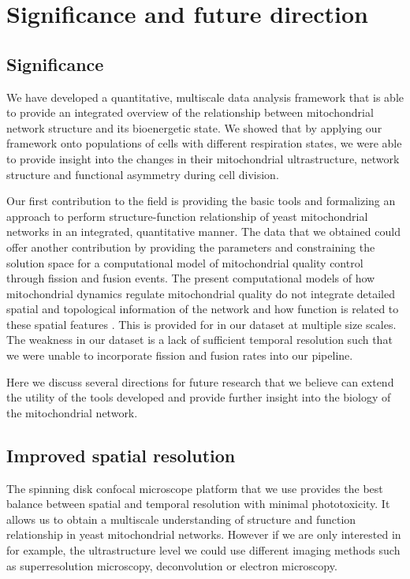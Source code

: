 \chapter{Significance and future direction}\label{ch:seven}
\section{Significance}
We have developed a quantitative, multiscale data analysis framework that is able to provide an integrated overview of the relationship between mitochondrial network structure and its bioenergetic state. We showed that by applying our framework onto populations of cells with different respiration states, we were able to provide insight into the changes in their mitochondrial ultrastructure, network structure and functional asymmetry during cell division.

Our first contribution to the field is providing the basic tools and formalizing an approach to perform structure-function relationship of yeast mitochondrial networks in an integrated, quantitative manner. The data that we obtained could offer another contribution by providing the parameters and constraining the solution space for a computational model of mitochondrial quality control through fission and fusion events. The present computational models of how mitochondrial dynamics regulate mitochondrial quality do not integrate detailed spatial and topological information of the network and how function is related to these spatial features \cite{mouli_frequency_2009,patel_optimal_2013}. This is provided for in our dataset at multiple size scales. The weakness in our dataset is a lack of sufficient temporal resolution such that we were unable to incorporate fission and fusion rates into our pipeline.
 
Here we discuss several directions for future research that we believe can extend the utility of the tools developed and provide further insight into the biology of the mitochondrial network.
\section{Improved spatial resolution}
The spinning disk confocal microscope platform that we use provides the best balance between spatial and temporal resolution with minimal phototoxicity. It allows us to obtain a multiscale understanding of structure and function relationship in yeast mitochondrial networks. However if we are only interested in for example, the ultrastructure level we could use different imaging methods such as superresolution microscopy, deconvolution or electron microscopy.

